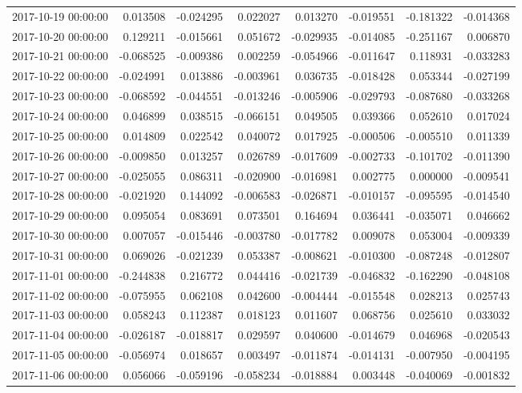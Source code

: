 \begin{tabular}{lrrrrrrr}
2017-10-19 00:00:00 & 0.013508 & -0.024295 & 0.022027 & 0.013270 & -0.019551 & -0.181322 & -0.014368 \\
2017-10-20 00:00:00 & 0.129211 & -0.015661 & 0.051672 & -0.029935 & -0.014085 & -0.251167 & 0.006870 \\
2017-10-21 00:00:00 & -0.068525 & -0.009386 & 0.002259 & -0.054966 & -0.011647 & 0.118931 & -0.033283 \\
2017-10-22 00:00:00 & -0.024991 & 0.013886 & -0.003961 & 0.036735 & -0.018428 & 0.053344 & -0.027199 \\
2017-10-23 00:00:00 & -0.068592 & -0.044551 & -0.013246 & -0.005906 & -0.029793 & -0.087680 & -0.033268 \\
2017-10-24 00:00:00 & 0.046899 & 0.038515 & -0.066151 & 0.049505 & 0.039366 & 0.052610 & 0.017024 \\
2017-10-25 00:00:00 & 0.014809 & 0.022542 & 0.040072 & 0.017925 & -0.000506 & -0.005510 & 0.011339 \\
2017-10-26 00:00:00 & -0.009850 & 0.013257 & 0.026789 & -0.017609 & -0.002733 & -0.101702 & -0.011390 \\
2017-10-27 00:00:00 & -0.025055 & 0.086311 & -0.020900 & -0.016981 & 0.002775 & 0.000000 & -0.009541 \\
2017-10-28 00:00:00 & -0.021920 & 0.144092 & -0.006583 & -0.026871 & -0.010157 & -0.095595 & -0.014540 \\
2017-10-29 00:00:00 & 0.095054 & 0.083691 & 0.073501 & 0.164694 & 0.036441 & -0.035071 & 0.046662 \\
2017-10-30 00:00:00 & 0.007057 & -0.015446 & -0.003780 & -0.017782 & 0.009078 & 0.053004 & -0.009339 \\
2017-10-31 00:00:00 & 0.069026 & -0.021239 & 0.053387 & -0.008621 & -0.010300 & -0.087248 & -0.012807 \\
2017-11-01 00:00:00 & -0.244838 & 0.216772 & 0.044416 & -0.021739 & -0.046832 & -0.162290 & -0.048108 \\
2017-11-02 00:00:00 & -0.075955 & 0.062108 & 0.042600 & -0.004444 & -0.015548 & 0.028213 & 0.025743 \\
2017-11-03 00:00:00 & 0.058243 & 0.112387 & 0.018123 & 0.011607 & 0.068756 & 0.025610 & 0.033032 \\
2017-11-04 00:00:00 & -0.026187 & -0.018817 & 0.029597 & 0.040600 & -0.014679 & 0.046968 & -0.020543 \\
2017-11-05 00:00:00 & -0.056974 & 0.018657 & 0.003497 & -0.011874 & -0.014131 & -0.007950 & -0.004195 \\
2017-11-06 00:00:00 & 0.056066 & -0.059196 & -0.058234 & -0.018884 & 0.003448 & -0.040069 & -0.001832 \\

\end{tabular}
